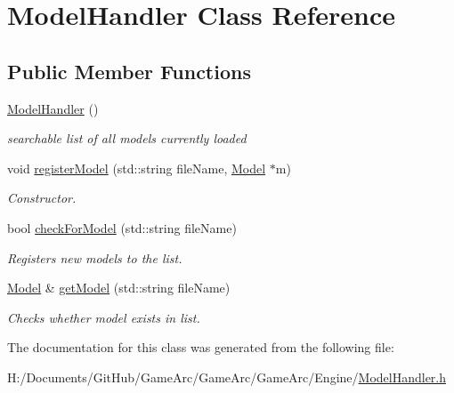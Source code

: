 \hypertarget{class_model_handler}{\section{Model\+Handler Class Reference}
\label{class_model_handler}
}
\subsection*{Public Member Functions}
\begin{DoxyCompactItemize}
\item 
\hypertarget{class_model_handler_a1eb33fd62e57a5115a2755090a533deb}{\hyperlink{class_model_handler_a1eb33fd62e57a5115a2755090a533deb}{Model\+Handler} ()}\label{class_model_handler_a1eb33fd62e57a5115a2755090a533deb}

\begin{DoxyCompactList}\small\item\em searchable list of all models currently loaded \end{DoxyCompactList}\item 
\hypertarget{class_model_handler_ae2951e55741cc31e6490f5d98d3e84f5}{void \hyperlink{class_model_handler_ae2951e55741cc31e6490f5d98d3e84f5}{register\+Model} (std\+::string file\+Name, \hyperlink{class_model}{Model} $\ast$m)}\label{class_model_handler_ae2951e55741cc31e6490f5d98d3e84f5}

\begin{DoxyCompactList}\small\item\em Constructor. \end{DoxyCompactList}\item 
\hypertarget{class_model_handler_a935ceff894c06148839d8f6ae1b59272}{bool \hyperlink{class_model_handler_a935ceff894c06148839d8f6ae1b59272}{check\+For\+Model} (std\+::string file\+Name)}\label{class_model_handler_a935ceff894c06148839d8f6ae1b59272}

\begin{DoxyCompactList}\small\item\em Registers new models to the list. \end{DoxyCompactList}\item 
\hypertarget{class_model_handler_a2a705ce466c536b85cdaccef1bd12990}{\hyperlink{class_model}{Model} \& \hyperlink{class_model_handler_a2a705ce466c536b85cdaccef1bd12990}{get\+Model} (std\+::string file\+Name)}\label{class_model_handler_a2a705ce466c536b85cdaccef1bd12990}

\begin{DoxyCompactList}\small\item\em Checks whether model exists in list. \end{DoxyCompactList}\end{DoxyCompactItemize}


The documentation for this class was generated from the following file\+:\begin{DoxyCompactItemize}
\item 
H\+:/\+Documents/\+Git\+Hub/\+Game\+Arc/\+Game\+Arc/\+Game\+Arc/\+Engine/\hyperlink{_model_handler_8h}{Model\+Handler.\+h}\end{DoxyCompactItemize}
